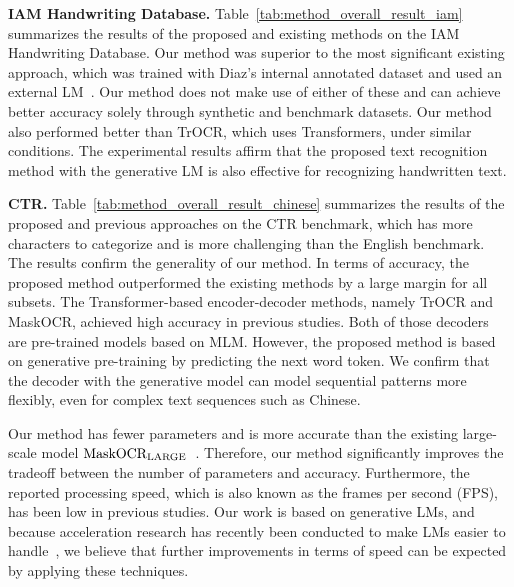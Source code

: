 \documentclass[10pt,twocolumn,letterpaper]{article}
\begin{document}
\noindent
\textbf{IAM Handwriting Database.}
Table~\ref{tab:method_overall_result_iam} summarizes the results of the proposed and existing methods on the IAM Handwriting Database. 
Our method was superior to the most significant existing approach, which was trained with Diaz's internal annotated dataset and used an external LM~\cite{diaz2021rethinking}. 
Our method does not make use of either of these and can achieve better accuracy solely through synthetic and benchmark datasets.
Our method also performed better than TrOCR, which uses Transformers, under similar conditions. 
The experimental results affirm that the proposed text recognition method with the generative LM is also effective for recognizing handwritten text.


\noindent
\textbf{CTR.}
Table~\ref{tab:method_overall_result_chinese} summarizes the results of the proposed and previous approaches on the CTR benchmark, which has more characters to categorize and is more challenging than the English benchmark. The results confirm the generality of our method.
In terms of accuracy, the proposed method outperformed the existing methods by a large margin for all subsets.
The Transformer-based encoder-decoder methods, namely TrOCR and MaskOCR, achieved high accuracy in previous studies.
Both of those decoders are pre-trained models based on MLM.
However, the proposed method is based on generative pre-training by predicting the next word token.
We confirm that the decoder with the generative model can model sequential patterns more flexibly, even for complex text sequences such as Chinese.


Our method has fewer parameters and is more accurate than the existing large-scale model $\textrm{MaskOCR}_{\rm LARGE}$~\cite{lyu2022maskocr}.
Therefore, our method significantly improves the tradeoff between the number of parameters and accuracy.
Furthermore, the reported processing speed, which is also known as the frames per second (FPS), has been low in previous studies.
Our work is based on generative LMs, and because acceleration research has recently been conducted to make LMs easier to handle~\cite{dettmers2022llm}, we believe that further improvements in terms of speed can be expected by applying these techniques.
\end{document}
